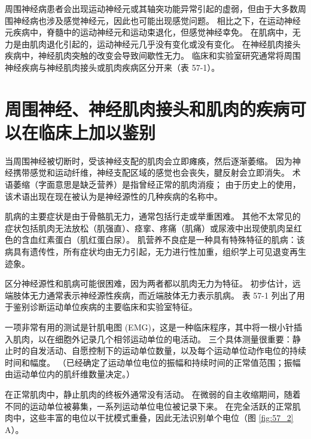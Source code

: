 周围神经病患者会出现运动神经元或其轴突功能异常引起的虚弱，但由于大多数周围神经病也涉及感觉神经元，因此也可能出现感觉问题。 相比之下，在运动神经元疾病中，脊髓中的运动神经元和运动束退化，但感觉神经幸免。 在肌病中，无力是由肌肉退化引起的，运动神经元几乎没有变化或没有变化。 在神经肌肉接头疾病中，神经肌肉突触的改变会导致间歇性无力。 临床和实验室研究通常将周围神经疾病与神经肌肉接头或肌肉疾病区分开来（表 57-1）。

\section{周围神经、神经肌肉接头和肌肉的疾病可以在临床上加以鉴别}
当周围神经被切断时，受该神经支配的肌肉会立即瘫痪，然后逐渐萎缩。 因为神经携带感觉和运动纤维，神经支配区域的感觉也会丧失，腱反射会立即消失。 术语萎缩（字面意思是缺乏营养）是指曾经正常的肌肉消瘦； 由于历史上的使用，该术语出现在现在被认为是神经源性的几种疾病的名称中。

肌病的主要症状是由于骨骼肌无力，通常包括行走或举重困难。 其他不太常见的症状包括肌肉无法放松（肌强直）、痉挛、疼痛（肌痛）或尿液中出现使肌肉呈红色的含血红素蛋白（肌红蛋白尿）。 肌营养不良症是一种具有特殊特征的肌病：该病具有遗传性，所有症状均由无力引起，无力进行性加重，组织学上可见退变再生迹象。

区分神经源性和肌病可能很困难，因为两者都以肌肉无力为特征。 初步估计，远端肢体无力通常表示神经源性疾病，而近端肢体无力表示肌病。 表 57-1 列出了用于鉴别诊断运动单位疾病的主要临床和实验室特征。

一项非常有用的测试是针肌电图 (EMG)，这是一种临床程序，其中将一根小针插入肌肉，以在细胞外记录几个相邻运动单位的电活动。 三个具体测量很重要：静止时的自发活动、自愿控制下的运动单位数量，以及每个运动单位动作电位的持续时间和幅度。 （已经确定了运动单位电位的振幅和持续时间的正常值范围；振幅由运动单位内的肌纤维数量决定。）

在正常肌肉中，静止肌肉的终板外通常没有活动。 在微弱的自主收缩期间，随着不同的运动单位被募集，一系列运动单位电位被记录下来。 在完全活跃的正常肌肉中，这些丰富的电位以干扰模式重叠，因此无法识别单个电位（图 \ref{fig:57_2} A）。

